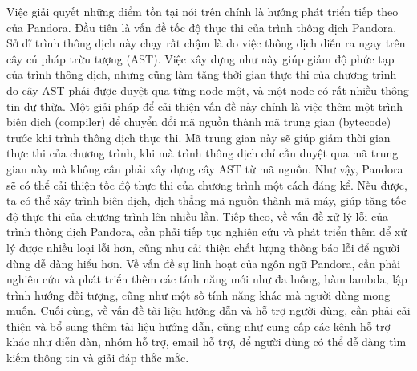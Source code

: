Việc giải quyết những điểm tồn tại nói trên chính là hướng phát triển tiếp theo của Pandora. Đầu tiên là vấn đề tốc độ thực thi của trình thông dịch Pandora. Sở dĩ trình thông dịch này chạy rất chậm là do việc thông dịch diễn ra ngay trên cây cú pháp trừu tượng (AST). Việc xây dựng như này giúp giảm độ phức tạp của trình thông dịch, nhưng cũng làm tăng thời gian thực thi của chương trình do cây AST phải được duyệt qua từng node một, và một node có rất nhiều thông tin dư thừa. Một giải pháp để cải thiện vấn đề này chính là việc thêm một trình biên dịch (compiler) để chuyển đổi mã nguồn thành mã trung gian (bytecode) trước khi trình thông dịch thực thi. Mã trung gian này sẽ giúp giảm thời gian thực thi của chương trình, khi mà trình thông dịch chỉ cần duyệt qua mã trung gian này mà không cần phải xây dựng cây AST từ mã nguồn. Như vậy, Pandora sẽ có thể cải thiện tốc độ thực thi của chương trình một cách đáng kể. Nếu được, ta có thể xây trình biên dịch, dịch thẳng mã nguồn thành mã máy, giúp tăng tốc độ thực thi của chương trình lên nhiều lần. Tiếp theo, về vấn đề xử lý lỗi của trình thông dịch Pandora, cần phải tiếp tục nghiên cứu và phát triển thêm để xử lý được nhiều loại lỗi hơn, cũng như cải thiện chất lượng thông báo lỗi để người dùng dễ dàng hiểu hơn. Về vấn đề sự linh hoạt của ngôn ngữ Pandora, cần phải nghiên cứu và phát triển thêm các tính năng mới như đa luồng, hàm lambda, lập trình hướng đối tượng, cũng như một số tính năng khác mà người dùng mong muốn. Cuối cùng, về vấn đề tài liệu hướng dẫn và hỗ trợ người dùng, cần phải cải thiện và bổ sung thêm tài liệu hướng dẫn, cũng như cung cấp các kênh hỗ trợ khác như diễn đàn, nhóm hỗ trợ, email hỗ trợ, để người dùng có thể dễ dàng tìm kiếm thông tin và giải đáp thắc mắc.
